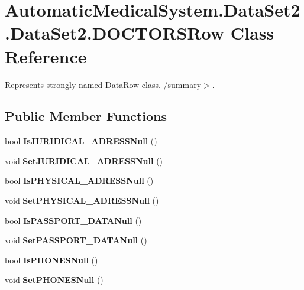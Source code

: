 \section{AutomaticMedicalSystem.DataSet2.DataSet2.DOCTORSRow Class Reference}
\label{class_automatic_medical_system_1_1_data_set2_1_1_d_o_c_t_o_r_s_row}
Represents strongly named DataRow class. /summary$>$.  


\subsection*{Public Member Functions}
\begin{CompactItemize}
\item 
bool \textbf{IsJURIDICAL\_\-ADRESSNull} ()\label{class_automatic_medical_system_1_1_data_set2_1_1_d_o_c_t_o_r_s_row_7d2ba8ca836593cc568b6a88a6b216b4}

\item 
void \textbf{SetJURIDICAL\_\-ADRESSNull} ()\label{class_automatic_medical_system_1_1_data_set2_1_1_d_o_c_t_o_r_s_row_732b45fc7cecc20a770f2ec883ab2390}

\item 
bool \textbf{IsPHYSICAL\_\-ADRESSNull} ()\label{class_automatic_medical_system_1_1_data_set2_1_1_d_o_c_t_o_r_s_row_ff813bfe41fdc98612072a8d851d93d0}

\item 
void \textbf{SetPHYSICAL\_\-ADRESSNull} ()\label{class_automatic_medical_system_1_1_data_set2_1_1_d_o_c_t_o_r_s_row_86bc0134b961d097f6c98eda02f6bb93}

\item 
bool \textbf{IsPASSPORT\_\-DATANull} ()\label{class_automatic_medical_system_1_1_data_set2_1_1_d_o_c_t_o_r_s_row_df010a21433bb2f91a60dc472975b8cd}

\item 
void \textbf{SetPASSPORT\_\-DATANull} ()\label{class_automatic_medical_system_1_1_data_set2_1_1_d_o_c_t_o_r_s_row_275cbe7a102525fb7ad138cb1bcaaef7}

\item 
bool \textbf{IsPHONESNull} ()\label{class_automatic_medical_system_1_1_data_set2_1_1_d_o_c_t_o_r_s_row_61334ce6195577ad1cd672d8132c9f01}

\item 
void \textbf{SetPHONESNull} ()\label{class_automatic_medical_system_1_1_data_set2_1_1_d_o_c_t_o_r_s_row_e912a18c5bba3af10aa4f72094f9b8fa}


\end{CompactItemize}

